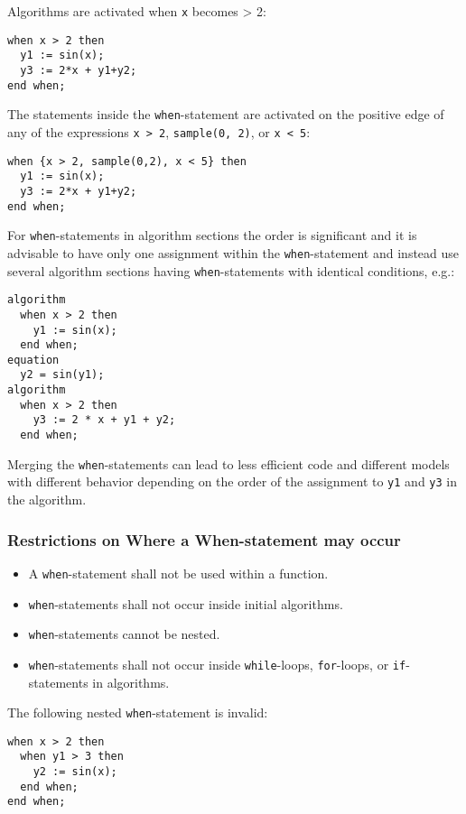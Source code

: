 \begin{example}
Algorithms are activated when \lstinline!x! becomes \textgreater{} 2:
\begin{lstlisting}[language=modelica]
when x > 2 then
  y1 := sin(x);
  y3 := 2*x + y1+y2;
end when;
\end{lstlisting}
The statements inside the \lstinline!when!-statement are activated on the positive edge of any of the expressions \lstinline!x > 2!, \lstinline!sample(0, 2)!, or \lstinline!x < 5!:
\begin{lstlisting}[language=modelica]
when {x > 2, sample(0,2), x < 5} then
  y1 := sin(x);
  y3 := 2*x + y1+y2;
end when;
\end{lstlisting}
For \lstinline!when!-statements in algorithm sections the order is significant and it is advisable to have only one assignment within the \lstinline!when!-statement and instead use several algorithm sections having \lstinline!when!-statements with identical conditions, e.g.:
\begin{lstlisting}[language=modelica]
algorithm
  when x > 2 then
    y1 := sin(x);
  end when;
equation
  y2 = sin(y1);
algorithm
  when x > 2 then
    y3 := 2 * x + y1 + y2;
  end when;
\end{lstlisting}
Merging the \lstinline!when!-statements can lead to less efficient code and different models with different behavior depending on the order of the assignment to \lstinline!y1! and \lstinline!y3! in the algorithm.
\end{example}

\subsubsection{Restrictions on Where a When-statement may occur}\label{restrictions-on-where-a-when-statement-may-occur}

\begin{itemize}
\item
  A \lstinline!when!-statement shall not be used within a function.
\item
  \lstinline!when!-statements shall not occur inside initial algorithms.
\item
  \lstinline!when!-statements cannot be nested.
\item
  \lstinline!when!-statements shall not occur inside \lstinline!while!-loops, \lstinline!for!-loops, or \lstinline!if!-statements in algorithms.
\end{itemize}

\begin{example}
The following nested \lstinline!when!-statement is invalid:
\begin{lstlisting}[language=modelica]
when x > 2 then
  when y1 > 3 then
    y2 := sin(x);
  end when;
end when;
\end{lstlisting}
\end{example}

